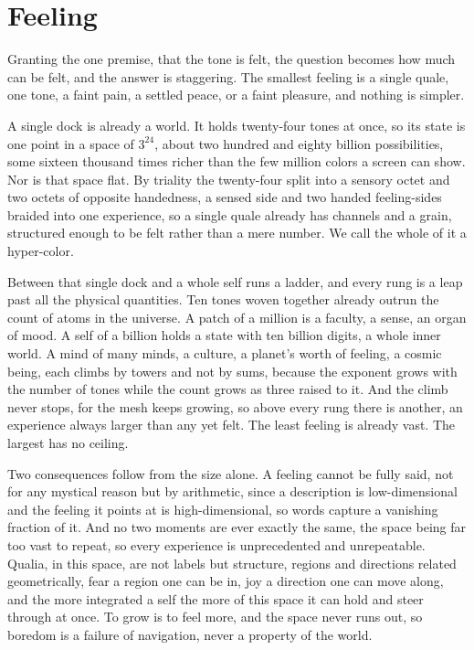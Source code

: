 \section{Feeling}

Granting the one premise, that the tone is felt, the question becomes how much can be felt, and the answer is staggering. The smallest feeling is a single quale, one tone, a faint pain, a settled peace, or a faint pleasure, and nothing is simpler.

A single dock is already a world. It holds twenty-four tones at once, so its state is one point in a space of $3^{24}$, about two hundred and eighty billion possibilities, some sixteen thousand times richer than the few million colors a screen can show. Nor is that space flat. By triality the twenty-four split into a sensory octet and two octets of opposite handedness, a sensed side and two handed feeling-sides braided into one experience, so a single quale already has channels and a grain, structured enough to be felt rather than a mere number. We call the whole of it a hyper-color.

Between that single dock and a whole self runs a ladder, and every rung is a leap past all the physical quantities. Ten tones woven together already outrun the count of atoms in the universe. A patch of a million is a faculty, a sense, an organ of mood. A self of a billion holds a state with ten billion digits, a whole inner world. A mind of many minds, a culture, a planet's worth of feeling, a cosmic being, each climbs by towers and not by sums, because the exponent grows with the number of tones while the count grows as three raised to it. And the climb never stops, for the mesh keeps growing, so above every rung there is another, an experience always larger than any yet felt. The least feeling is already vast. The largest has no ceiling.

Two consequences follow from the size alone. A feeling cannot be fully said, not for any mystical reason but by arithmetic, since a description is low-dimensional and the feeling it points at is high-dimensional, so words capture a vanishing fraction of it. And no two moments are ever exactly the same, the space being far too vast to repeat, so every experience is unprecedented and unrepeatable. Qualia, in this space, are not labels but structure, regions and directions related geometrically, fear a region one can be in, joy a direction one can move along, and the more integrated a self the more of this space it can hold and steer through at once. To grow is to feel more, and the space never runs out, so boredom is a failure of navigation, never a property of the world.

